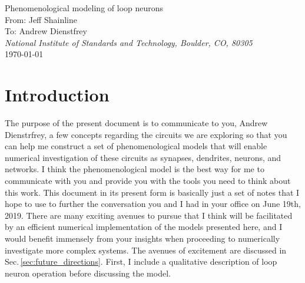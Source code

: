 \documentclass[]{article}
\begin{document}
    
\begin{center}
\LARGE{Phenomenological modeling of loop neurons}\\ 
\vspace{0.3em}
\large From: Jeff Shainline \\
\large To: Andrew Dienstfrey\\
\vspace{0.0em}
\textit{\small National Institute of Standards and Technology, Boulder, CO, 80305}\\
\vspace{0.3em}
\small \today

\begin{abstract}

\vspace{1em}
\end{abstract}

\end{center}


\setcounter{tocdepth}{1}
\setcounter{secnumdepth}{4}
\tableofcontents

\section{\label{sec:introduction}Introduction}
The purpose of the present document is to communicate to you, Andrew Dienstrfrey, a few concepts regarding the circuits we are exploring so that you can help me construct a set of phenomenological models that will enable numerical investigation of these circuits as synapses, dendrites, neurons, and networks. I think the phenomenological model is the best way for me to communicate with you and provide you with the tools you need to think about this work. This document in its present form is basically just a set of notes that I hope to use to further the conversation you and I had in your office on June 19th, 2019. There are many exciting avenues to pursue that I think will be facilitated by an efficient numerical implementation of the models presented here, and I would benefit immensely from your insights when proceeding to numerically investigate more complex systems. The avenues of excitement are discussed in Sec.\,\ref{sec:future_directions}. First, I include a qualitative description of loop neuron operation before discussing the model.
\end{document}

